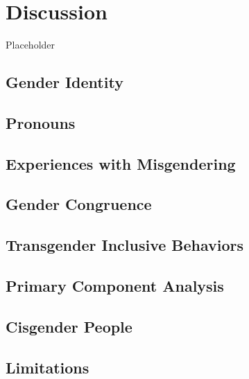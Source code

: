 \documentclass[12pt,twoside]{reedthesis}
\begin{document}
\hypertarget{discussion}{%
\chapter{Discussion}\label{discussion}}

Placeholder

\hypertarget{gender-identity-1}{%
\section{Gender Identity}\label{gender-identity-1}}

\hypertarget{pronouns-2}{%
\section{Pronouns}\label{pronouns-2}}

\hypertarget{experiences-with-misgendering-1}{%
\section{Experiences with Misgendering}\label{experiences-with-misgendering-1}}

\hypertarget{gender-congruence-1}{%
\section{Gender Congruence}\label{gender-congruence-1}}

\hypertarget{transgender-inclusive-behaviors-1}{%
\section{Transgender Inclusive Behaviors}\label{transgender-inclusive-behaviors-1}}

\hypertarget{primary-component-analysis-1}{%
\section{Primary Component Analysis}\label{primary-component-analysis-1}}

\hypertarget{cisgender-people}{%
\section{Cisgender People}\label{cisgender-people}}

\hypertarget{limitations}{%
\section{Limitations}\label{limitations}}
\end{document}
